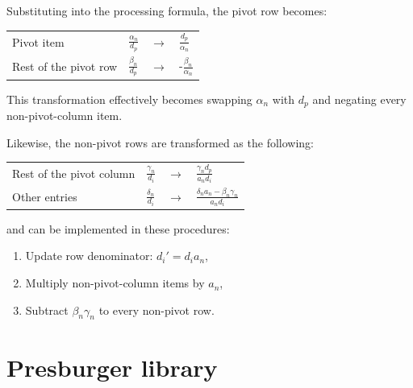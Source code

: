 \documentclass[logo,bsc,singlespacing,parskip]{infthesis}
\newenvironment{compactlist}
{ \begin{enumerate}
    \setlength{\itemsep}{0pt}
    \setlength{\parskip}{0pt}
    \setlength{\parsep}{0pt}     
}
{ \end{enumerate} }
\begin{document}
Substituting into the processing formula, the pivot row becomes:
\vspace*{-4mm}
\begin{table}[H]
\begin{center}
\begin{tabular}{llll}
Pivot item           & $\frac{\alpha_n}{d_p}$ & $\rightarrow$ & $\frac{d_p}{\alpha_n}$       \\
Rest of the pivot row    & $\frac{\beta_n}{d_p}$  & $\rightarrow$ & -$\frac{\beta_n}{\alpha_n}$  
\end{tabular}
\end{center}
\end{table}
\vspace*{-8mm}
This transformation effectively becomes swapping $\alpha_n$ with $d_p$ and
negating every non-pivot-column item. 

Likewise, the non-pivot rows are transformed as the following:
\vspace*{-4mm}
\begin{table}[H]
\begin{center}
\begin{tabular}{llll}
Rest of the pivot column& $\frac{\gamma_n}{d_i}$ & $\rightarrow$ & $\frac{\gamma_nd_p}{a_nd_i}$            \\
Other entries         & $\frac{\delta_n}{d_i}$    & $\rightarrow$ & $\frac{\delta_na_n-\beta_n\gamma_n}{a_nd_i}$  
\end{tabular}
\end{center}
\end{table}
\vspace*{-8mm}
and can be implemented in these procedures: 
\vspace*{-2.0mm}
\begin{compactlist}
    \item Update row denominator: $d_i' = d_ia_n$, 
    \item Multiply non-pivot-column items by $a_n$,
    \item Subtract $\beta_n\gamma_n$ to every non-pivot row.
\end{compactlist}

\section{Presburger library}
\label{sec:presburger}
\end{document}
